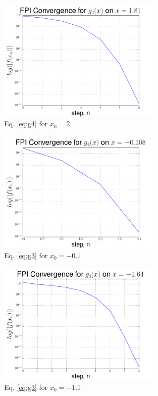 \documentclass[12pt]{article}
\begin{document}
  \begin{figure}[h]
    \centering
    \includegraphics[width=0.7\textwidth]{Problem5d.png}
    \caption{Eq. \ref{eq:g4} for $x_0 = 2$}
  \end{figure}

  \begin{figure}[h]
    \centering
    \includegraphics[width=0.7\textwidth]{Problem5e.png}
    \caption{Eq. \ref{eq:g3} for $x_0 = -0.1$}
  \end{figure}

  \begin{figure}[h]
    \centering
    \includegraphics[width=0.7\textwidth]{Problem5f.png}
    \caption{Eq. \ref{eq:g3} for $x_0 = -1.1$}
  \end{figure}
\end{document}
